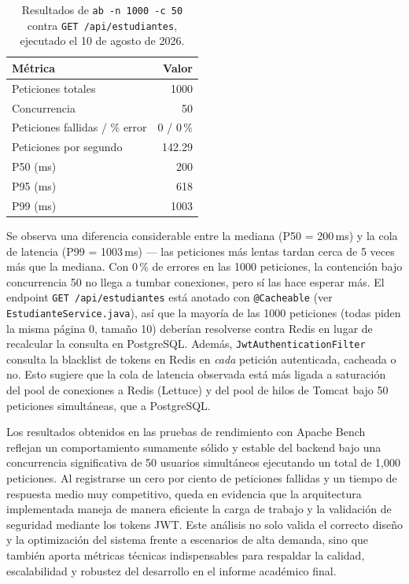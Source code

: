 \documentclass[12pt,a4paper]{article}
\begin{document}
\begin{table}[h!]
\centering
\begin{tabular}{@{}lr@{}}
\toprule
\textbf{Métrica} & \textbf{Valor} \\
\midrule
Peticiones totales & 1000 \\
Concurrencia        & 50 \\
Peticiones fallidas / \% error & 0 / 0\,\% \\
Peticiones por segundo & 142.29 \\
P50 (ms) & 200 \\
P95 (ms) & 618 \\
P99 (ms) & 1003 \\
\bottomrule
\end{tabular}
\caption{Resultados de \texttt{ab -n 1000 -c 50} contra \texttt{GET /api/estudiantes}, ejecutado el 10 de agosto de 2026.}
\label{tab:apache-bench}
\end{table}

Se observa una diferencia considerable entre la mediana (P50 = 200\,ms) y
la cola de latencia (P99 = 1003\,ms) --- las peticiones más lentas tardan
cerca de 5 veces más que la mediana. Con 0\,\% de errores en las 1000
peticiones, la contención bajo concurrencia 50 no llega a tumbar
conexiones, pero sí las hace esperar más. El endpoint
\texttt{GET /api/estudiantes} está anotado con \texttt{@Cacheable} (ver
\texttt{EstudianteService.java}), así que la mayoría de las 1000
peticiones (todas piden la misma página 0, tamaño 10) deberían resolverse
contra Redis en lugar de recalcular la consulta en PostgreSQL. Además,
\texttt{JwtAuthenticationFilter} consulta la blacklist de tokens en Redis
en \emph{cada} petición autenticada, cacheada o no. Esto sugiere que la
cola de latencia observada está más ligada a saturación del pool de
conexiones a Redis (Lettuce) y del pool de hilos de Tomcat bajo 50
peticiones simultáneas, que a PostgreSQL.

Los resultados obtenidos en las pruebas de rendimiento con Apache Bench reflejan un comportamiento sumamente sólido y estable del backend bajo una concurrencia significativa de 50 usuarios simultáneos ejecutando un total de 1,000 peticiones. Al registrarse un cero por ciento de peticiones fallidas y un tiempo de respuesta medio muy competitivo, queda en evidencia que la arquitectura implementada maneja de manera eficiente la carga de trabajo y la validación de seguridad mediante los tokens JWT. Este análisis no solo valida el correcto diseño y la optimización del sistema frente a escenarios de alta demanda, sino que también aporta métricas técnicas indispensables para respaldar la calidad, escalabilidad y robustez del desarrollo en el informe académico final.
	
\end{document}
